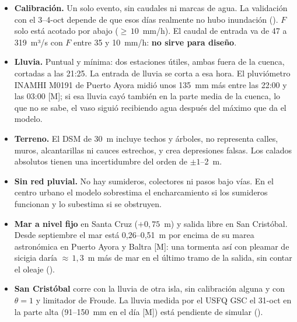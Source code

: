 \documentclass{sosg-informe}
\begin{document}
\begin{itemize}
  \item \textbf{Calibración.} Un solo evento, sin caudales ni marcas de agua. La validación con el 3--4-oct depende de que esos días realmente no hubo inundación (). $F$ solo está acotado por abajo (${\geq}\,10$~mm/h). El caudal de entrada va de 47 a 319~m³/s con $F$ entre 35 y 10~mm/h: \textbf{no sirve para diseño}.
  \item \textbf{Lluvia.} Puntual y mínima: dos estaciones útiles, ambas fuera de la cuenca, cortadas a las 21:25. La entrada de lluvia se corta a esa hora. El pluviómetro INAMHI M0191 de Puerto Ayora midió unos 135~mm más entre las 22:00 y las 03:00 [M]; si esa lluvia cayó también en la parte media de la cuenca, lo que no se sabe, el vaso siguió recibiendo agua después del máximo que da el modelo.
  \item \textbf{Terreno.} El DSM de 30~m incluye techos y árboles, no representa calles, muros, alcantarillas ni cauces estrechos, y crea depresiones falsas. Los calados absolutos tienen una incertidumbre del orden de ${\pm}1$--2~m.
  \item \textbf{Sin red pluvial.} No hay sumideros, colectores ni pasos bajo vías. En el centro urbano el modelo sobrestima el encharcamiento si los sumideros funcionan y lo subestima si se obstruyen.
  \item \textbf{Mar a nivel fijo} en Santa Cruz ($+0,75$~m) y salida libre en San Cristóbal. Desde septiembre el mar está 0,26--0,51~m por encima de su marea astronómica en Puerto Ayora y Baltra [M]: una tormenta así con pleamar de sicigia daría ${\approx}\,1,3$~m más de mar en el último tramo de la salida, sin contar el oleaje ().
  \item \textbf{San Cristóbal} corre con la lluvia de otra isla, sin calibración alguna y con $\theta = 1$ y limitador de Froude. La lluvia medida por el USFQ GSC el 31-oct en la parte alta (91--150~mm en el día [M]) está pendiente de simular ().
\end{itemize}

\end{document}
